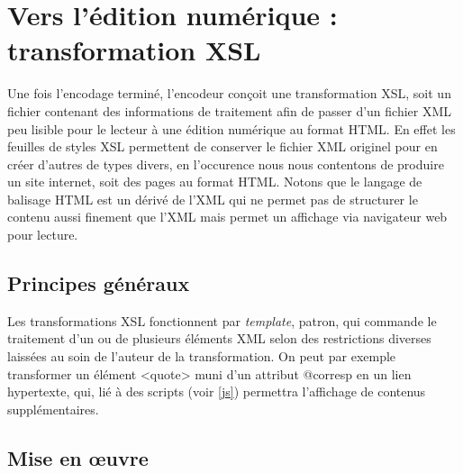 \documentclass[12pt, a4paper]{article}
\begin{document}






\section{Vers l'édition numérique : transformation XSL}
\label{ref:xsl_gen}
Une fois l'encodage terminé, l'encodeur conçoit une transformation XSL, soit un fichier contenant des informations de traitement afin de passer d'un fichier XML peu lisible pour le lecteur à une édition numérique au format HTML. En effet les feuilles de styles XSL permettent de conserver le fichier XML originel pour en créer d'autres de types divers, en l'occurence nous nous contentons de produire un site internet, soit des pages au format HTML. Notons que le langage de balisage HTML est un dérivé de l'XML qui ne permet pas de structurer le contenu aussi finement que l'XML mais permet un affichage via navigateur web pour lecture.
    \subsection{Principes généraux}
Les transformations XSL fonctionnent par \textit{template}, patron, qui commande le traitement d'un ou de plusieurs éléments XML selon des restrictions diverses laissées au soin de l'auteur de la transformation. On peut par exemple transformer un élément <quote> muni d'un attribut @corresp en un lien hypertexte, qui, lié à des scripts (voir \ref{js}) permettra l'affichage de contenus supplémentaires. 
    \subsection{Mise en œuvre}
\end{document}
